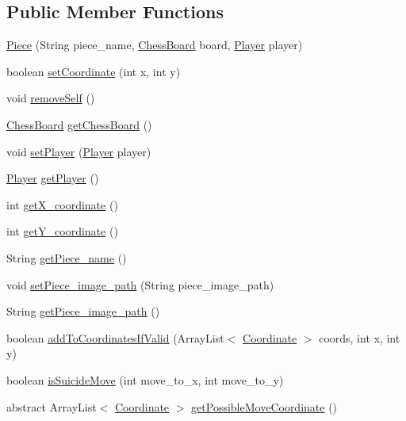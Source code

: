 \subsection*{Public Member Functions}
\begin{DoxyCompactItemize}
\item 
\hyperlink{classpiece_1_1_piece_a2a951c56b9c86a93fab817ddb7da4413}{Piece} (String piece\+\_\+name, \hyperlink{classchessboard_1_1_chess_board}{Chess\+Board} board, \hyperlink{enumchessboard_1_1_player}{Player} player)
\item 
boolean \hyperlink{classpiece_1_1_piece_a22f311f1704a5fff7041bf311a88bb80}{set\+Coordinate} (int x, int y)
\item 
void \hyperlink{classpiece_1_1_piece_a2b2074610fdf598443fcc3f0b1a32f13}{remove\+Self} ()
\item 
\hyperlink{classchessboard_1_1_chess_board}{Chess\+Board} \hyperlink{classpiece_1_1_piece_a1004705760b36db3185de90faaf76bbc}{get\+Chess\+Board} ()
\item 
void \hyperlink{classpiece_1_1_piece_a01948cad1916776f6a900c2918f395c3}{set\+Player} (\hyperlink{enumchessboard_1_1_player}{Player} player)
\item 
\hyperlink{enumchessboard_1_1_player}{Player} \hyperlink{classpiece_1_1_piece_ac2f9d5a3cef28997c6bfab69792a2898}{get\+Player} ()
\item 
int \hyperlink{classpiece_1_1_piece_a0b9fa85eb166a0290e7825daddd7d129}{get\+X\+\_\+coordinate} ()
\item 
int \hyperlink{classpiece_1_1_piece_a12a8ca4143a3d3937ad8071d9e29c171}{get\+Y\+\_\+coordinate} ()
\item 
String \hyperlink{classpiece_1_1_piece_afb5b4b2899fb574b421125c12e4adc31}{get\+Piece\+\_\+name} ()
\item 
void \hyperlink{classpiece_1_1_piece_a07277fb8549c95d3522223790bf8a7c5}{set\+Piece\+\_\+image\+\_\+path} (String piece\+\_\+image\+\_\+path)
\item 
String \hyperlink{classpiece_1_1_piece_a0e49c966ed4a5dde90300825502ae4fd}{get\+Piece\+\_\+image\+\_\+path} ()
\item 
boolean \hyperlink{classpiece_1_1_piece_a9e8b91312f7a03a15cc987b5f5a99989}{add\+To\+Coordinates\+If\+Valid} (Array\+List$<$ \hyperlink{classpiece_1_1_coordinate}{Coordinate} $>$ coords, int x, int y)
\item 
boolean \hyperlink{classpiece_1_1_piece_a728dd68ae470d81a229e068a098c8e0c}{is\+Suicide\+Move} (int move\+\_\+to\+\_\+x, int move\+\_\+to\+\_\+y)
\item 
abstract Array\+List$<$ \hyperlink{classpiece_1_1_coordinate}{Coordinate} $>$ \hyperlink{classpiece_1_1_piece_a9ac176ed64bf25c3fdbf5668ba4011e4}{get\+Possible\+Move\+Coordinate} ()
\end{DoxyCompactItemize}
